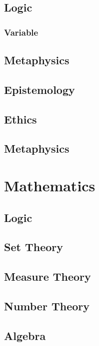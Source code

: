 \documentclass{article}
\begin{document}
\subsection{Logic}
\subsubsection{Variable}

\subsection{Metaphysics}

\subsection{Epistemology}

\subsection{Ethics}

\subsection{Metaphysics}

\section{Mathematics}

\subsection{Logic}

\subsection{Set Theory}

\subsection{Measure Theory}

\subsection{Number Theory}

\subsection{Algebra}
\end{document}
